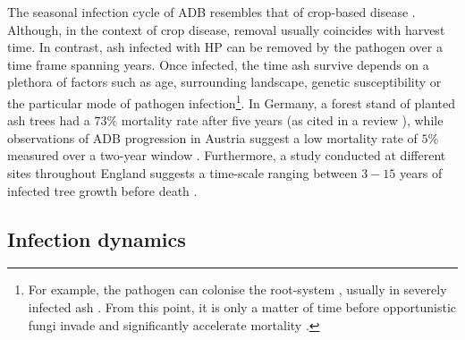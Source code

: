 The seasonal infection cycle of ADB resembles that of crop-based disease \cite{tankam2020modelling}. Although, in the context of crop disease, removal usually coincides with harvest time. In contrast, ash infected with HP can be removed by the pathogen over a time frame spanning years. Once infected, the time ash survive depends on a plethora of factors such as age, surrounding landscape, genetic susceptibility or the particular mode of pathogen infection\footnote{For example, the pathogen can colonise the root-system \cite{schumacher2011general}, usually in severely infected ash \cite{https://doi.org/10.1111/mpp.12073}. From this point, it is only a matter of time before opportunistic fungi invade and significantly accelerate mortality \cite{enderle2013temporal}.}. In Germany, a forest stand of planted ash trees had a $73\%$ mortality rate after five years \cite{langer2015ash} (as cited in a review \cite{enderle2017ash}), while observations of ADB progression in Austria suggest a low mortality rate of $5\%$ measured over a two-year window \cite{kessler2012dieback}. Furthermore, a study conducted at different sites throughout England suggests a time-scale ranging between $3-15$ years of infected tree growth before death \cite{wylder2018evidence}.


\subsection{Infection dynamics}
\label{sec:infection-dynamics}

